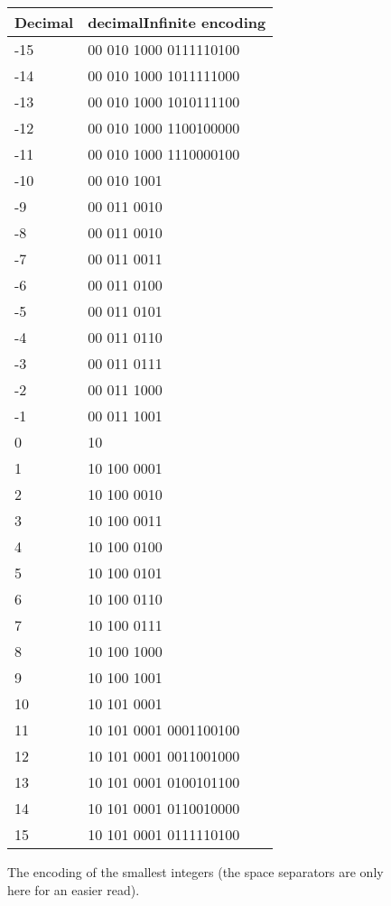 \documentclass{acm_proc_article-sp}
\begin{document}
\begin{figure}[h]
\caption{The encoding of the smallest integers (the space separators are only here for an easier read).}
\label{figure-first-integers}
\center
\begin{tabular}{|l|l|}
\hline
Decimal & decimalInfinite encoding \\
\hline
-15 & 00 010 1000 0111110100\\
\hline
-14 & 00 010 1000 1011111000\\
\hline
-13 & 00 010 1000 1010111100\\
\hline
-12 & 00 010 1000 1100100000\\
\hline
-11 & 00 010 1000 1110000100\\
\hline
-10 & 00 010 1001\\
\hline
-9 & 00 011 0010\\
\hline
-8 & 00 011 0010\\
\hline
-7 & 00 011 0011\\
\hline
-6 & 00 011 0100\\
\hline
-5 & 00 011 0101\\
\hline
-4 & 00 011 0110\\
\hline
-3 & 00 011 0111\\
\hline
-2 & 00 011 1000\\
\hline
-1 & 00 011 1001\\
\hline
0 & 10 \\
\hline
1 & 10 100 0001\\
\hline
2 & 10 100 0010\\
\hline
3 & 10 100 0011\\
\hline
4 & 10 100 0100\\
\hline
5 & 10 100 0101\\
\hline
6 & 10 100 0110\\
\hline
7 & 10 100 0111\\
\hline
8 & 10 100 1000\\
\hline
9 & 10 100 1001\\
\hline
10 & 10 101 0001\\
\hline
11 & 10 101 0001 0001100100\\
\hline
12 & 10 101 0001 0011001000\\
\hline
13 & 10 101 0001 0100101100\\
\hline
14 & 10 101 0001 0110010000\\
\hline
15 & 10 101 0001 0111110100\\
\hline
\hline
\end{tabular}
\end{figure}
\end{document}

